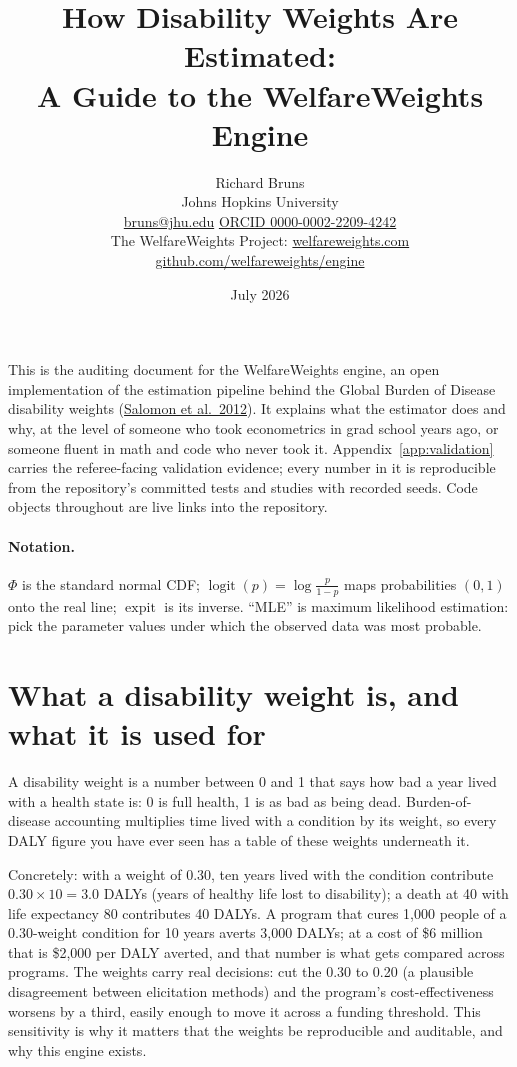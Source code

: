 \documentclass[11pt]{article}
\title{How Disability Weights Are Estimated:\\ A Guide to the WelfareWeights Engine}
\author{Richard Bruns\\ Johns Hopkins University\\ \href{mailto:bruns@jhu.edu}{bruns@jhu.edu} \quad\textbullet\quad \href{https://orcid.org/0000-0002-2209-4242}{ORCID 0000-0002-2209-4242}\\[0.6em] The WelfareWeights Project: \href{https://welfareweights.com}{welfareweights.com} \quad\textbullet\quad \href{\repo}{github.com/welfareweights/engine}}
\date{July 2026}
\newcommand{\logit}{\operatorname{logit}}
\newcommand{\expit}{\operatorname{expit}}
\begin{document}
\maketitle

This is the auditing document for the WelfareWeights engine, an open implementation of the estimation pipeline behind the Global Burden of Disease disability weights (\href{https://doi.org/10.1016/S0140-6736(12)61680-8}{Salomon et al.\ 2012}). It explains what the estimator does and why, at the level of someone who took econometrics in grad school years ago, or someone fluent in math and code who never took it. Appendix~\ref{app:validation} carries the referee-facing validation evidence; every number in it is reproducible from the repository's committed tests and studies with recorded seeds. Code objects throughout are live links into the repository.

\paragraph{Notation.} $\Phi$ is the standard normal CDF; $\logit(p)=\log\frac{p}{1-p}$ maps probabilities $(0,1)$ onto the real line; $\expit$ is its inverse. ``MLE'' is maximum likelihood estimation: pick the parameter values under which the observed data was most probable.

\section{What a disability weight is, and what it is used for}

A disability weight is a number between 0 and 1 that says how bad a year lived with a health state is: 0 is full health, 1 is as bad as being dead. Burden-of-disease accounting multiplies time lived with a condition by its weight, so every DALY figure you have ever seen has a table of these weights underneath it.

Concretely: with a weight of 0.30, ten years lived with the condition contribute $0.30 \times 10 = 3.0$ DALYs (years of healthy life lost to disability); a death at 40 with life expectancy 80 contributes 40 DALYs. A program that cures 1{,}000 people of a 0.30-weight condition for 10 years averts 3{,}000 DALYs; at a cost of \$6 million that is \$2{,}000 per DALY averted, and that number is what gets compared across programs. The weights carry real decisions: cut the 0.30 to 0.20 (a plausible disagreement between elicitation methods) and the program's cost-effectiveness worsens by a third, easily enough to move it across a funding threshold. This sensitivity is why it matters that the weights be reproducible and auditable, and why this engine exists.
\end{document}
